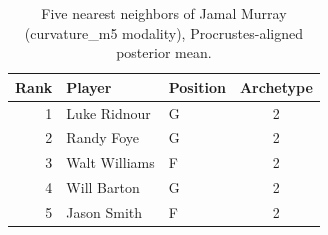 \begin{table}[htbp]
  \centering\small
  \begin{tabular}{rllc}
    \toprule
    Rank & Player & Position & Archetype \\
    \midrule
    1 & Luke Ridnour & G & 2 \\
    2 & Randy Foye & G & 2 \\
    3 & Walt Williams & F & 2 \\
    4 & Will Barton & G & 2 \\
    5 & Jason Smith & F & 2 \\
    \bottomrule
  \end{tabular}
  \caption{Five nearest neighbors of Jamal Murray (curvature_m5 modality), Procrustes-aligned posterior mean.}
  \label{tab:Jamal_Murray_neighbors_curvature_m5}
\end{table}

